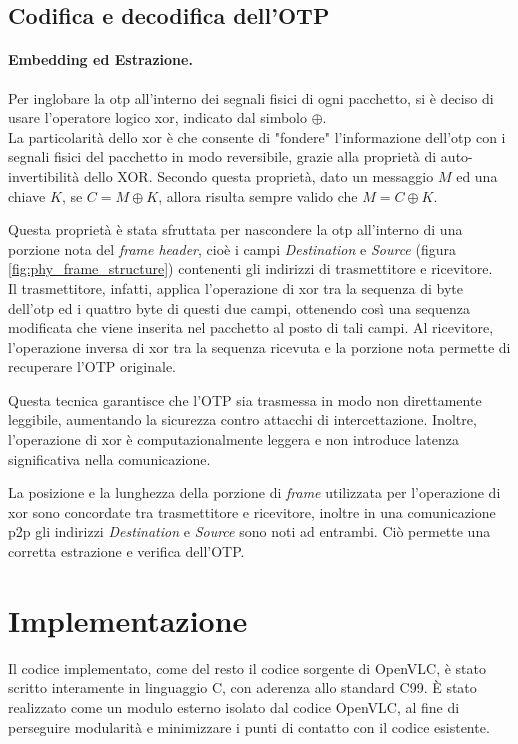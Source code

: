 \subsection{Codifica e decodifica dell'OTP}

\paragraph{Embedding ed Estrazione.}
Per inglobare la \gls{otp} all'interno dei segnali fisici di ogni pacchetto, si è deciso di usare l'operatore logico \gls{xor}\glsfirstoccur, indicato dal simbolo \(\oplus\).\\
La particolarità dello \gls{xor} è che consente di "fondere" l'informazione dell'\gls{otp} con i segnali fisici del pacchetto in modo reversibile, grazie alla proprietà di auto-invertibilità dello XOR. Secondo questa proprietà, dato un messaggio \( M \) ed una chiave \( K \), se \( C = M \oplus K \), allora risulta sempre valido che \( M = C \oplus K \).

Questa proprietà è stata sfruttata per nascondere la \gls{otp} all'interno di una porzione nota del \textit{frame header}, cioè i campi \textit{Destination} e \textit{Source} (figura \ref{fig:phy_frame_structure}) contenenti gli indirizzi di trasmettitore e ricevitore.\\
Il trasmettitore, infatti, applica l'operazione di \gls{xor} tra la sequenza di byte dell'\gls{otp} ed i quattro byte di questi due campi, ottenendo così una sequenza modificata che viene inserita nel pacchetto al posto di tali campi. Al ricevitore, l'operazione inversa di \gls{xor} tra la sequenza ricevuta e la porzione nota permette di recuperare l'OTP originale.

Questa tecnica garantisce che l'OTP sia trasmessa in modo non direttamente leggibile, aumentando la sicurezza contro attacchi di intercettazione. Inoltre, l'operazione di \gls{xor} è computazionalmente leggera e non introduce latenza significativa nella comunicazione.

La posizione e la lunghezza della porzione di \textit{frame} utilizzata per l'operazione di \gls{xor} sono concordate tra trasmettitore e ricevitore, inoltre in una comunicazione \gls{p2p} gli indirizzi \textit{Destination} e \textit{Source} sono noti ad entrambi. Ciò permette una corretta estrazione e verifica dell'OTP.


\section{Implementazione}
Il codice implementato, come del resto il codice sorgente di OpenVLC, è stato scritto interamente in linguaggio C, con aderenza allo standard C99. È stato realizzato come un modulo esterno isolato dal codice OpenVLC, al fine di perseguire modularità e minimizzare i punti di contatto con il codice esistente.

